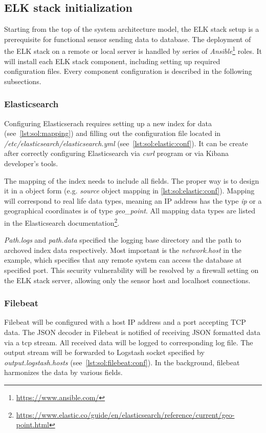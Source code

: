 \documentclass[12pt,a4paper,twoside]{report}
\begin{document}
		\subsection{ELK stack initialization} \label{solution:design:elk}
			Starting from the top of the system architecture model, the ELK stack setup is a prerequisite for functional sensor sending data to database. The deployment of the ELK stack on a remote or local server is handled by series of \emph{Ansible}\footnote{\url{https://www.ansible.com/}} roles. It will install each ELK stack component, including setting up required configuration files. Every component configuration is described in the following subsections. 
			\subsubsection*{Elasticsearch}
				Configuring Elasticserach requires setting up a new index for data (see~\autoref{lst:sol:mapping}) and filling out the configuration file located in \emph{/etc/elasticsearch/elasticsearch.yml} (see~\autoref{lst:sol:elastic:conf}). It can be create after correctly configuring Elasticsearch via \emph{curl} program or via Kibana developer's tools.
				
				The mapping of the index needs to include all fields. The proper way is to design it in a object form (e.g. \emph{source} object mapping in \autoref{lst:sol:elastic:conf}). Mapping will correspond to real life data types, meaning an IP address has the type \emph{ip} or a geographical coordinates is of type \emph{geo\_point}. All mapping data types are listed in the Elasticsearch documentation\footnote{\url{https://www.elastic.co/guide/en/elasticsearch/reference/current/geo-point.html}}.
				\par
				\emph{Path.logs} and \emph{path.data} specified the logging base directory and the path to archoved index data respectively. Most important is the \emph{network.host} in the example, which specifies that any remote system can access the database at specified port. This security vulnerability will be resolved by a firewall setting on the ELK stack server, allowing only the sensor host and localhost connections.
			\subsubsection*{Filebeat}
				Filebeat will be configured with a host IP address and a port accepting TCP data. The JSON decoder in Filebeat is notified of receiving JSON formatted data via a tcp stream. All received data will be logged to corresponding log file. The output stream will be forwarded to Logstash socket specified by \emph{output.logstash.hosts} (see~\autoref{lst:sol:filebeat:conf}). In the background, filebeat harmonizes the data by various fields.
				
\end{document}
